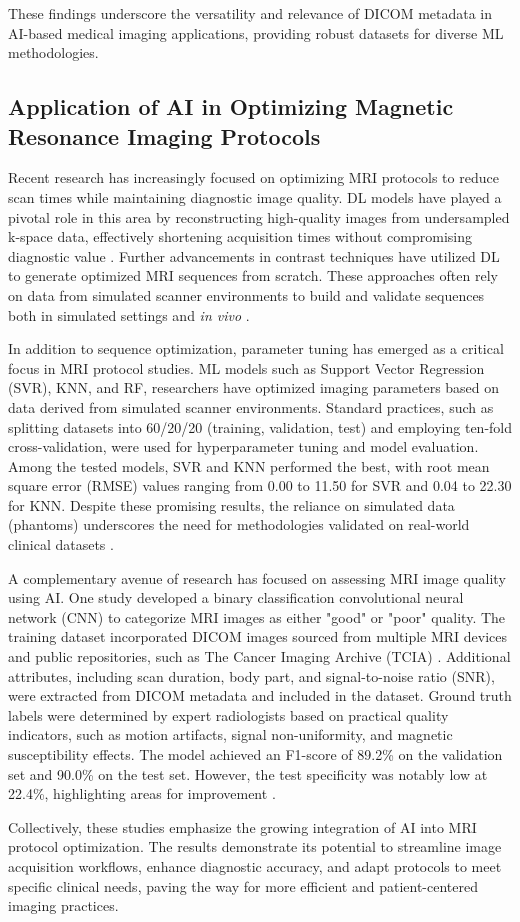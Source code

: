 These findings underscore the versatility and relevance of DICOM metadata in AI-based medical imaging applications, providing robust datasets for diverse ML methodologies.

\subsection{Application of AI in Optimizing Magnetic Resonance Imaging Protocols}
Recent research has increasingly focused on optimizing MRI protocols to reduce scan times while maintaining diagnostic image quality. DL models have played a pivotal role in this area by reconstructing high-quality images from undersampled k-space data, effectively shortening acquisition times without compromising diagnostic value \cite{samplingMri,acceleratedMri,mriHighQuality,undersampleRec}. Further advancements in contrast techniques have utilized DL to generate optimized MRI sequences from scratch. These approaches often rely on data from simulated scanner environments to build and validate sequences both in simulated settings and \textit{in vivo} \cite{mrZero}.

In addition to sequence optimization, parameter tuning has emerged as a critical focus in MRI protocol studies. ML models such as Support Vector Regression (SVR), KNN, and RF, researchers have optimized imaging parameters based on data derived from simulated scanner environments. Standard practices, such as splitting datasets into 60/20/20 (training, validation, test) and employing ten-fold cross-validation, were used for hyperparameter tuning and model evaluation. Among the tested models, SVR and KNN performed the best, with root mean square error (RMSE) values ranging from 0.00 to 11.50 for SVR and 0.04 to 22.30 for KNN. Despite these promising results, the reliance on simulated data (phantoms) underscores the need for methodologies validated on real-world clinical datasets \cite{optimStudy}.

A complementary avenue of research has focused on assessing MRI image quality using AI. One study developed a binary classification convolutional neural network (CNN) to categorize MRI images as either "good" or "poor" quality. The training dataset incorporated DICOM images sourced from multiple MRI devices and public repositories, such as The Cancer Imaging Archive (TCIA) \cite{tcia}. Additional attributes, including scan duration, body part, and signal-to-noise ratio (SNR), were extracted from DICOM metadata and included in the dataset. Ground truth labels were determined by expert radiologists based on practical quality indicators, such as motion artifacts, signal non-uniformity, and magnetic susceptibility effects. The model achieved an F1-score of 89.2\% on the validation set and 90.0\% on the test set. However, the test specificity was notably low at 22.4\%, highlighting areas for improvement \cite{imageQualityClass}.

Collectively, these studies emphasize the growing integration of AI into MRI protocol optimization. The results demonstrate its potential to streamline image acquisition workflows, enhance diagnostic accuracy, and adapt protocols to meet specific clinical needs, paving the way for more efficient and patient-centered imaging practices.